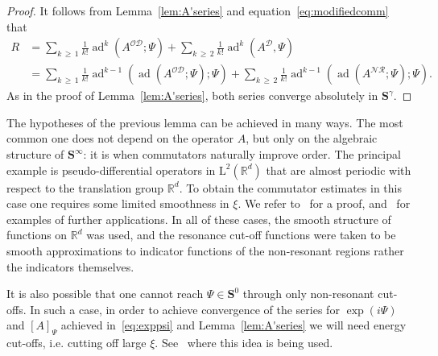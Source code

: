 \documentclass[AHL,Unicode,longabstracts,published]{cedram}
\DeclareMathOperator{\ad}{ad}
\newcommand{\RL}{\mathrm{L}}
\newcommand{\R}{\mathbb R}
\newcommand{\CD}{\mathcal{D}}
\newcommand{\CN}{\mathcal{N}}
\newcommand{\CO}{\mathcal{O}}
\newcommand{\CR}{\mathcal{R}}
\newcommand{\CNR}{{\CN\!\CR}}
\newcommand{\BS}{\mathbf S}
\begin{document}
\begin{proof}
It follows from Lemma~\ref{lem:A'series} and equation~\eqref{eq:modifiedcomm} that
\begin{equation}
\begin{aligned}
R &= \sum_{k\,\ge\,1} \frac{1}{k!} \ad^k\left(A^{\CO\CD};\Psi\right) + \sum_{k\,\ge\,2} \frac{1}{k!} \ad^{k}\left(A^{\CD},\Psi\right) \\
&= \sum_{k\,\ge\,1} \frac{1}{k!} \ad^{k-1}\left(\ad\left(A^{\CO\CD};\Psi\right);\Psi\right) + \sum_{k\,
\ge\,2} \frac{1}{k!} \ad^{k-1}\left(\ad\left(A^{\CNR};\Psi\right);\Psi\right).
\end{aligned}
\end{equation}
As in the proof of Lemma~\ref{lem:A'series}, both series converge absolutely in $\BS^{\gamma}$.
\end{proof}

\begin{rema}
The hypotheses of the previous lemma can be achieved in many ways. The most common one does not depend on the operator $A$, but only on the algebraic structure of $\BS^\infty$: it is when commutators naturally improve order. The principal example is pseudo-differential operators in $\RL^2(\R^d)$ that are almost periodic with respect to the translation group $\R^d$. To obtain the commutator estimates in this case one requires some limited smoothness in $\xi$. We refer to~\cite[Lemma~3.4]{Sobolev2005} for a proof, and~\cite{MorParSht2014,
ParSob2010,ParSht2012,
ParSht2016,Sobolev2006} for examples of further applications. In all of these cases, the smooth structure of functions on $\R^d$ was used, and the resonance cut-off functions were taken to be smooth approximations to indicator functions of the non-resonant regions rather the indicators themselves.

It is also possible that one cannot reach $\Psi \in \BS^0$ through only non-resonant cut-offs. In such a case, in order to achieve convergence of the series for $\exp(i\Psi)$ and $[A]_\Psi$ achieved in~\eqref{eq:exppsi} and Lemma~\ref{lem:A'series} we will need energy cut-offs, i.e. cutting off large $\xi$. See~\cite{MorParSht2014,ParSob2010} where this idea is being used.
\end{rema}
\end{document}
